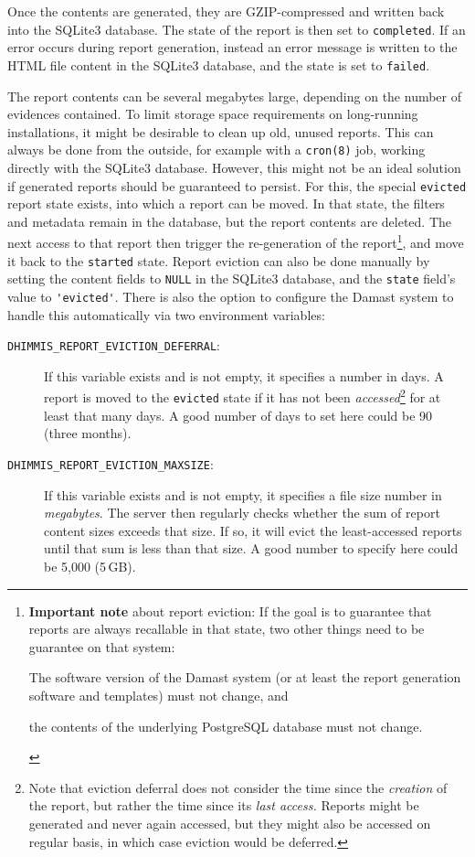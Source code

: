 Once the contents are generated, they are GZIP-compressed and written back into the SQLite3 database.
The state of the report is then set to \verb!completed!.
If an error occurs during report generation, instead an error message is written to the HTML file content in the SQLite3 database, and the state is set to \verb!failed!.

The report contents can be several megabytes large, depending on the number of evidences contained.
To limit storage space requirements on long-running installations, it might be desirable to clean up old, unused reports.
This can always be done from the outside, for example with a \verb!cron(8)! job, working directly with the SQLite3 database.
However, this might not be an ideal solution if generated reports should be guaranteed to persist.
For this, the special \verb!evicted! report state exists, into which a report can be moved.
In that state, the filters and metadata remain in the database, but the report contents are deleted.
The next access to that report then trigger the re-generation of the report\footnote{%
  \textbf{Important note} about report eviction:
  If the goal is to guarantee that reports are always recallable in that state, two other things need to be guarantee on that system:
  \begin{enumerate*}[label=(\arabic*)]
    \item The software version of the Damast system (or at least the report generation software and templates) must not change, and
    \item the contents of the underlying PostgreSQL database must not change.
  \end{enumerate*}
}, and move it back to the \verb!started! state.
Report eviction can also be done manually by setting the content fields to \verb!NULL! in the SQLite3 database, and the \verb!state! field's value to \verb!'evicted'!.
There is also the option to configure the Damast system to handle this automatically via two environment variables:

\begin{description}
  \item[\texttt{DHIMMIS\_REPORT\_EVICTION\_DEFERRAL}:]
    If this variable exists and is not empty, it specifies a number in days.
    A report is moved to the \texttt{evicted} state if it has not been \emph{accessed}\footnote{%
      Note that eviction deferral does not consider the time since the \emph{creation} of the report, but rather the time since its \emph{last access.}
      Reports might be generated and never again accessed, but they might also be accessed on regular basis, in which case eviction would be deferred.
    } for at least that many days.
    A good number of days to set here could be 90 (three months).
  \item[\texttt{DHIMMIS\_REPORT\_EVICTION\_MAXSIZE}:]
    If this variable exists and is not empty, it specifies a file size number in \emph{megabytes}.
    The server then regularly checks whether the sum of report content sizes exceeds that size.
    If so, it will evict the least-accessed reports until that sum is less than that size.
    A good number to specify here could be 5,000 (5\,GB).
\end{description}


